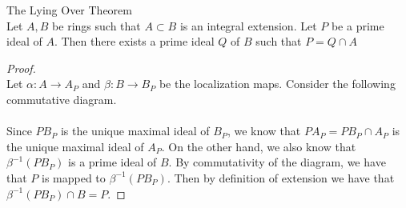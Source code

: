 \documentclass[a4paper]{article}
\begin{document}
\begin{thm}{The Lying Over Theorem}{}\\
Let $A,B$ be rings such that $A\subset B$ is an integral extension. Let $P$ be a prime ideal of $A$. Then there exists a prime ideal $Q$ of $B$ such that $P=Q\cap A$
\begin{proof}\\
Let $\alpha:A\to A_P$ and $\beta:B\to B_P$ be the localization maps. Consider the following commutative diagram. \\
\\
Since $PB_P$ is the unique maximal ideal of $B_P$, we know that $PA_P=PB_P\cap A_P$ is the unique maximal ideal of $A_P$. On the other hand, we also know that $\beta^{-1}(PB_P)$ is a prime ideal of $B$. By commutativity of the diagram, we have that $P$ is mapped to $\beta^{-1}(PB_P)$. Then by definition of extension we have that $\beta^{-1}(PB_P)\cap B=P$. 
\end{proof}
\end{thm}
\end{document}
